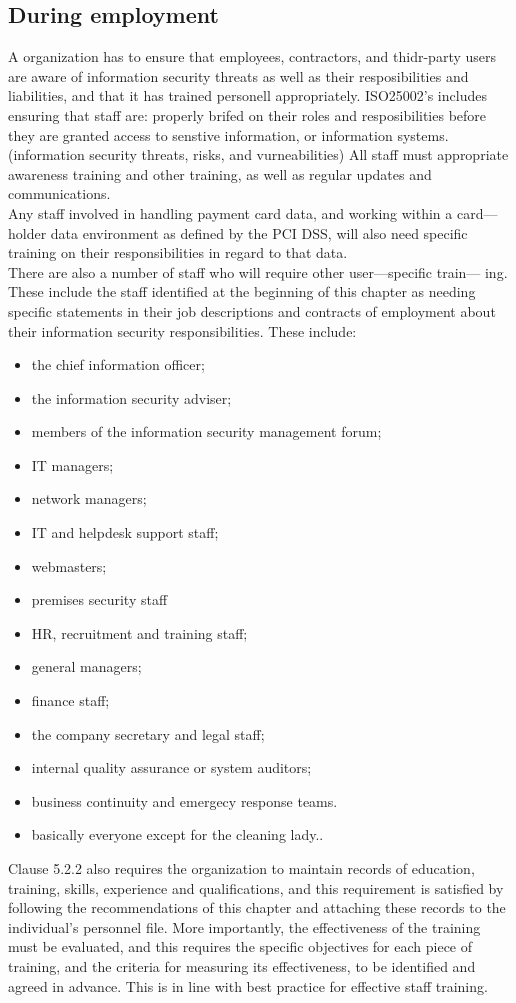\subsection{During employment}
A organization has to ensure that employees, contractors, and thidr-party users
are aware of information security threats as well as their resposibilities and
liabilities, and that it has trained personell appropriately. ISO25002's 
includes ensuring that staff are: properly brifed on their roles and 
resposibilities before they are granted access to senstive information, or
information systems.(information security threats, risks, and vurneabilities) 
All staff must appropriate awareness training and other training, as well as 
regular updates and communications.\\

Any staff involved in handling payment card data, and working within a card—
holder data environment as defined by the PCI DSS, will also need specific
training on their responsibilities in regard to that data.\\
There are also a number of staff who will require other user—specific train—
ing. These include the staff identified at the beginning of this chapter as needing
specific statements in their job descriptions and contracts of employment
about their information security responsibilities. These include:
\begin{itemize}
    \item the chief information officer;
    \item the information security adviser;
    \item members of the information security management forum;
    \item IT managers;
    \item network managers;
    \item IT and helpdesk support staff;
    \item webmasters;
    \item premises security staff
    \item HR, recruitment and training staff;
    \item general managers;
    \item finance staff;
    \item the company secretary and legal staff;
    \item internal quality assurance or system auditors;
    \item business continuity and emergecy response teams.
    \item basically everyone except for the cleaning lady..
\end{itemize}
Clause 5.2.2 also requires the organization to maintain records of education, 
training, skills, experience and qualifications, and this requirement is
satisfied by following the recommendations of this chapter and attaching these
records to the individual’s personnel file. More importantly, the effectiveness of
the training must be evaluated, and this requires the specific objectives for
each piece of training, and the criteria for measuring its effectiveness, to be
identified and agreed in advance. This is in line with best practice for effective
staff training.

